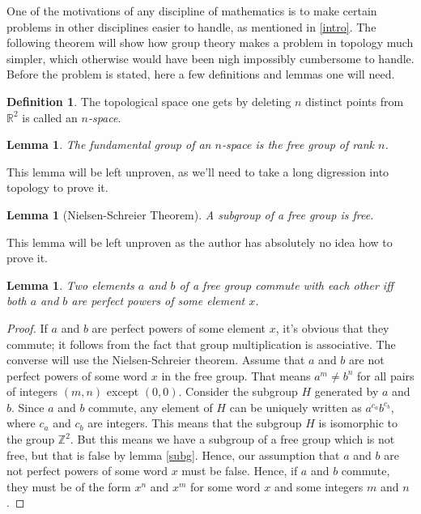 \documentclass[12pt, titlepage]{article}
\newtheorem{lem}[thm]{Lemma}
\theoremstyle{definition}
\newtheorem{defn}{Definition}[section]
\begin{document}
One of the motivations of any discipline of mathematics is to make certain problems in other disciplines easier to handle, as mentioned in \autoref{intro}. The following theorem will show how group theory makes a problem in topology much simpler, which otherwise would have been nigh impossibly cumbersome to handle. Before the problem is stated, here a few definitions and lemmas one will need.

\begin{defn}
The topological space one gets by deleting $n$ distinct points from $\mathbb{R}^2$ is called an \emph{$n$-space}.
\end{defn}

\begin{lem}
The \emph{fundamental group} of an $n$-space is the free group of rank $n$.
\end{lem}

This lemma will be left unproven, as we'll need to take a long digression into topology to prove it.

\begin{lem}[Nielsen-Schreier Theorem]\label{subg}
A subgroup of a free group is free.
\end{lem}

This lemma will be left unproven as the author has absolutely no idea how to prove it.

\begin{lem}\label{impo}
Two elements $a$ and $b$ of a free group commute with each other iff both $a$ and $b$ are perfect powers of some element $x$.
\end{lem}

\begin{proof}
If $a$ and $b$ are perfect powers of some element $x$, it's obvious that they commute; it follows from the fact that group multiplication is associative. The converse will use the Nielsen-Schreier theorem. Assume that $a$ and $b$ are not perfect powers of some word $x$ in the free group. That means $a^m \neq b^n$ for all pairs of integers $(m,n)$ except $(0,0)$. Consider the subgroup $H$ generated by $a$ and $b$. Since $a$ and $b$ commute, any element of $H$ can be uniquely written as $a^{c_a}b^{c_b}$, where $c_a$ and $c_b$ are integers. This means that the subgroup $H$ is isomorphic to the group $\mathbb{Z}^2$. But this means we have a subgroup of a free group which is not free, but that is false by lemma \autoref{subg}. Hence, our assumption that $a$ and $b$ are not perfect powers of some word $x$ must be false. Hence, if $a$ and $b$ commute, they must be of the form $x^n$ and $x^m$ for some word $x$ and some integers $m$ and $n$.
\end{proof}
\end{document}
